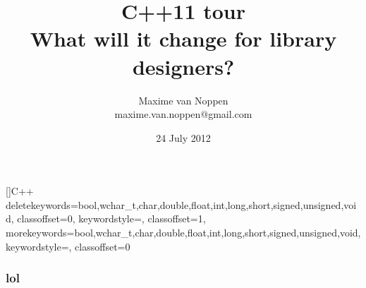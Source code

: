 \documentclass{beamer}
\title{C++11 tour\\What will it change for library designers?}
\author{Maxime van Noppen\\maxime.van.noppen@gmail.com}
\date{24 July 2012}
\begin{document}
[]{C++}%
  {
    deletekeywords={bool,wchar_t,char,double,float,int,long,short,signed,unsigned,void},
    classoffset=0,
    keywordstyle=\color{orange},
    classoffset=1,
    morekeywords={bool,wchar_t,char,double,float,int,long,short,signed,unsigned,void},
    keywordstyle=\color{blue},
    classoffset=0
  }%

\begin{frame}
\titlepage
\end{frame}

\begin{frame}[fragile]
\frametitle{lol}



\end{frame}
\end{document}

